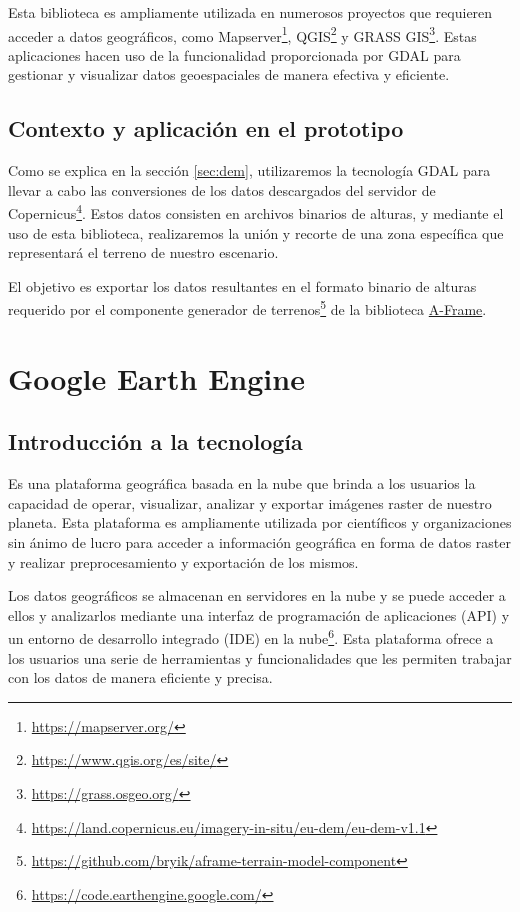\documentclass[a4paper, 11pt]{book}
\begin{document}
Esta biblioteca es ampliamente utilizada en numerosos proyectos que requieren acceder a datos geográficos, como Mapserver\footnote{\url{https://mapserver.org/}}, QGIS\footnote{\url{https://www.qgis.org/es/site/}} y GRASS GIS\footnote{\url{https://grass.osgeo.org/}}. Estas aplicaciones hacen uso de la funcionalidad proporcionada por GDAL para gestionar y visualizar datos geoespaciales de manera efectiva y eficiente.
\subsection{Contexto y aplicación en el prototipo}
Como se explica en la sección \ref{sec:dem}, utilizaremos la tecnología GDAL para llevar a cabo las conversiones de los datos descargados del servidor de Copernicus\footnote{\url{https://land.copernicus.eu/imagery-in-situ/eu-dem/eu-dem-v1.1}}. Estos datos consisten en archivos binarios de alturas, y mediante el uso de esta biblioteca, realizaremos la unión y recorte de una zona específica que representará el terreno de nuestro escenario.

El objetivo es exportar los datos resultantes en el formato binario de alturas requerido por el componente generador de terrenos\footnote{\url{https://github.com/bryik/aframe-terrain-model-component}} de la biblioteca \hyperref[sec:aframe]{A-Frame}.
\section{Google Earth Engine}
\subsection{Introducción a la tecnología}
Es una plataforma geográfica basada en la nube que brinda a los usuarios la capacidad de operar, visualizar, analizar y exportar imágenes raster de nuestro planeta. Esta plataforma es ampliamente utilizada por científicos y organizaciones sin ánimo de lucro para acceder a información geográfica en forma de datos raster y realizar preprocesamiento y exportación de los mismos.

Los datos geográficos se almacenan en servidores en la nube y se puede acceder a ellos y analizarlos mediante una interfaz de programación de aplicaciones (API) y un entorno de desarrollo integrado (IDE) en la nube\footnote{\url{https://code.earthengine.google.com/}}. Esta plataforma ofrece a los usuarios una serie de herramientas y funcionalidades que les permiten trabajar con los datos de manera eficiente y precisa.
\end{document}
